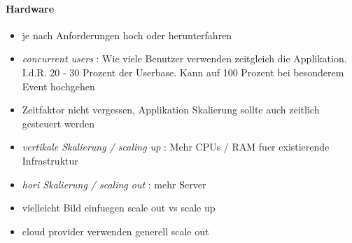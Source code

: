 \paragraph{Hardware}
\begin{itemize}
  \item je nach Anforderungen hoch oder herunterfahren
  \item \emph{concurrent users} : Wie viele Benutzer verwenden zeitgleich die Applikation. I.d.R. 20 - 30 Prozent der Userbase. Kann auf 100 Prozent bei besonderem Event hochgehen
  \item Zeitfaktor nicht vergessen, Applikation Skalierung sollte auch zeitlich gesteuert werden
  \item \emph{vertikale Skalierung / scaling up} : Mehr CPUs / RAM fuer existierende Infrastruktur
  \item \emph{hori Skalierung / scaling out} : mehr Server
  \item vielleicht Bild einfuegen scale out vs scale up
  \item cloud provider verwenden generell scale out
\end{itemize}

